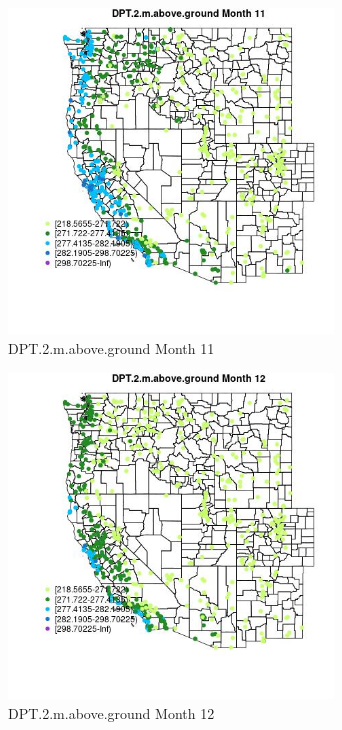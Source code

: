 \begin{figure} 
\centering  
\includegraphics[width=0.77\textwidth]{Code_Outputs/Report_ML_input_PM25_Step4_part_e_de_duplicated_aves_compiled_2019-05-21wNAs_MapObsMo11DPT2maboveground.jpg} 
\caption{\label{fig:Report_ML_input_PM25_Step4_part_e_de_duplicated_aves_compiled_2019-05-21wNAsMapObsMo11DPT2maboveground}DPT.2.m.above.ground Month 11} 
\end{figure} 
 

\begin{figure} 
\centering  
\includegraphics[width=0.77\textwidth]{Code_Outputs/Report_ML_input_PM25_Step4_part_e_de_duplicated_aves_compiled_2019-05-21wNAs_MapObsMo12DPT2maboveground.jpg} 
\caption{\label{fig:Report_ML_input_PM25_Step4_part_e_de_duplicated_aves_compiled_2019-05-21wNAsMapObsMo12DPT2maboveground}DPT.2.m.above.ground Month 12} 
\end{figure} 
 

